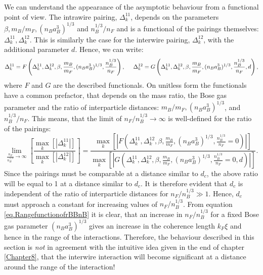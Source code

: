 We can understand the appearance of the asymptotic behaviour from a functional point of view. The intrawire pairing, $\Delta^{11}_k$, depends on the parameters $\beta, m_B/m_F, (n_Ba_B^3)^{1/3}$ and $n_B^{1/3}/n_F$ and is a functional of the pairings themselves: $\Delta^{11}_k, \Delta^{12}_k$. This is similarly the case for the interwire pairing, $\Delta^{12}_k$, with the additional parameter $d$. Hence, we can write:
\begin{equation}
\Delta^{11}_k = F\left(\Delta^{11}_k, \Delta^{12}_k, \beta, \frac{m_B}{m_F}, (n_Ba_B^3)^{1/3}, \frac{n_B^{1/3}}{n_F} \right), \hspace{0.5cm} \Delta^{12}_k = G\left(\Delta^{11}_k, \Delta^{12}_k, \beta, \frac{m_B}{m_F}, (n_Ba_B^3)^{1/3}, \frac{n_B^{1/3}}{n_F}, d \right), \nonumber 
\end{equation}
where $F$ and $G$ are the described functionals. On unitless form the functionals have a common prefactor, that depends on the mass ratio, the Bose gas parameter and the ratio of interparticle distances: $m_B/m_F, (n_Ba_B^3)^{1/3}$, and $n_B^{1/3}/n_F$. This means, that the limit of $n_F/n_B^{1/3} \to \infty $ is well-defined for the ratio of the pairings:
\begin{equation}
\lim_{\frac{n_F}{n_B^{1/3}} \to \infty} \left[\frac{\max_k[|\Delta^{11}_k|]}{\max_k[|\Delta^{12}_k|]}\right] = \frac{\max_k\left[\left|F\left(\Delta^{11}_k, \Delta^{12}_k, \beta, \frac{m_B}{m_F}, (n_Ba_B^3)^{1/3}, \frac{n_B^{1/3}}{n_F} = 0 \right)\right|\right] }{\max_k\left[\left|G\left(\Delta^{11}_k, \Delta^{12}_k, \beta, \frac{m_B}{m_F}, (n_Ba_B^3)^{1/3}, \frac{n_B^{1/3}}{n_F} = 0, d \right)\right|\right]}. \nonumber
\end{equation}
Since the pairings must be comparable at a distance similar to $d_c$, the above ratio will be equal to 1 at a distance similar to $d_c$. It is therefore evident that $d_c$ is independent of the ratio of interparticle distances for $n_F/n_B^{1/3} \gg 1$. Hence, $d_c$ must approach a constant for increasing values of $n_F/n_B^{1/3}$. From equation \eqref{eq.RangefunctionofrBBnB} it is clear, that an increase in $n_F/n_B^{1/3}$ for a fixed Bose gas parameter $(n_Ba_B^3)^{1/3}$ gives an increase in the coherence length $k_F\xi$ and hence in the range of the interactions. Therefore, the behaviour described in this section is \textit{not} in agreement with the intuitive idea given in the end of chapter \ref{Chapter8}, that the interwire interaction will become significant at a distance around the range of the interaction!

